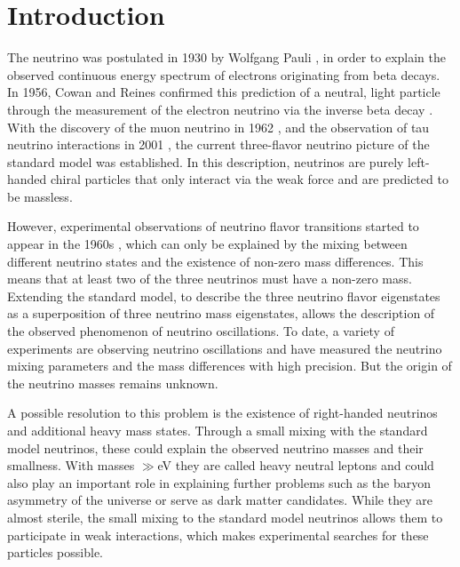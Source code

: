 \setchapterpreamble[u]{\margintoc}

\chapter{Introduction}

The neutrino was postulated in 1930 by Wolfgang Pauli , in order to explain the observed continuous energy spectrum of electrons originating from beta decays. In 1956, Cowan and Reines confirmed this prediction of a neutral, light particle through the measurement of the electron neutrino via the inverse beta decay . With the discovery of the muon neutrino in 1962 , and the observation of tau neutrino interactions in 2001 , the current three-flavor neutrino picture of the standard model was established. In this description, neutrinos are purely left-handed chiral particles that only interact via the weak force and are predicted to be massless.

However, experimental observations of neutrino flavor transitions started to appear in the 1960s , which can only be explained by the mixing between different neutrino states and the existence of non-zero mass differences. This means that at least two of the three neutrinos must have a non-zero mass. Extending the standard model, to describe the three neutrino flavor eigenstates as a superposition of three neutrino mass eigenstates, allows the description of the observed phenomenon of neutrino oscillations. To date, a variety of experiments are observing neutrino oscillations and have measured the neutrino mixing parameters and the mass differences with high precision. But the origin of the neutrino masses remains unknown.

A possible resolution to this problem is the existence of right-handed neutrinos and additional heavy mass states. Through a small mixing with the standard model neutrinos, these could explain the observed neutrino masses and their smallness. With masses $\gg$\si{\electronvolt} they are called heavy neutral leptons and could also play an important role in explaining further problems such as the baryon asymmetry of the universe or serve as dark matter candidates. While they are almost sterile, the small mixing to the standard model neutrinos allows them to participate in weak interactions, which makes experimental searches for these particles possible.

